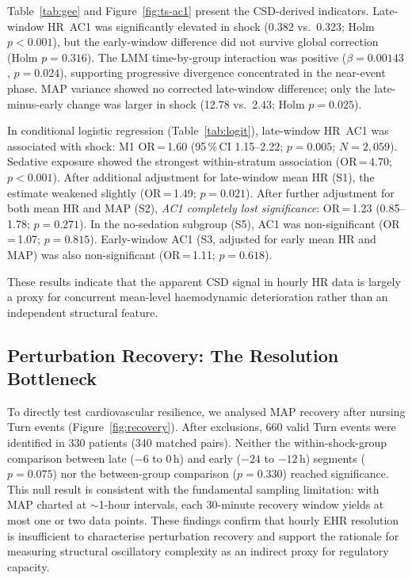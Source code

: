 \documentclass[12pt,a4paper]{article}
\begin{document}
Table~\ref{tab:gee} and Figure~\ref{fig:ts-ac1} present the
CSD-derived indicators.
Late-window HR~AC1 was significantly elevated in shock (0.382 vs.\ 0.323;
Holm $p<0.001$), but the early-window difference did not survive global
correction (Holm $p=0.316$).
The LMM time-by-group interaction was positive ($\beta=0.00143$, $p=0.024$),
supporting progressive divergence concentrated in the near-event phase.
MAP variance showed no corrected late-window difference; only the
late-minus-early change was larger in shock (12.78 vs.\ 2.43; Holm $p=0.025$).

In conditional logistic regression (Table~\ref{tab:logit}), late-window
HR~AC1 was associated with shock: M1 OR\,=\,1.60 (95\,\%\,CI 1.15--2.22;
$p=0.005$; $N=2{,}059$).
Sedative exposure showed the strongest within-stratum association
(OR\,=\,4.70; $p<0.001$).
After additional adjustment for late-window mean HR (S1), the estimate
weakened slightly (OR\,=\,1.49; $p=0.021$).
After further adjustment for both mean HR and MAP (S2), \emph{AC1 completely
lost significance}: OR\,=\,1.23 (0.85--1.78; $p=0.271$).
In the no-sedation subgroup (S5), AC1 was non-significant
(OR\,=\,1.07; $p=0.815$).
Early-window AC1 (S3, adjusted for early mean HR and MAP) was also
non-significant (OR\,=\,1.11; $p=0.618$).

These results indicate that the apparent CSD signal in hourly HR data is
largely a proxy for concurrent mean-level haemodynamic deterioration
rather than an independent structural feature.

\subsection{Perturbation Recovery: The Resolution Bottleneck}
\label{sec:perturb-results}

To directly test cardiovascular resilience, we analysed MAP recovery after
nursing Turn events (Figure~\ref{fig:recovery}).
After exclusions, 660 valid Turn events were identified in 330 patients
(340 matched pairs).
Neither the within-shock-group comparison between late ($-6$ to $0$\,h)
and early ($-24$ to $-12$\,h) segments ($p=0.075$) nor the between-group
comparison ($p=0.330$) reached significance.
This null result is consistent with the fundamental sampling limitation:
with MAP charted at $\sim$1-hour intervals, each 30-minute recovery window
yields at most one or two data points.
These findings confirm that hourly EHR resolution is insufficient to
characterise perturbation recovery and support the rationale for measuring
structural oscillatory complexity as an indirect proxy for regulatory capacity.
\end{document}
